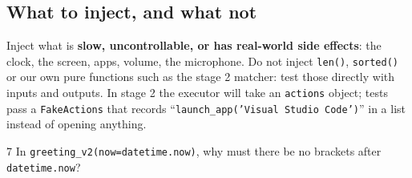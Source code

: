\documentclass[11pt,a4paper]{article}
\begin{document}
\subsection{What to inject, and what not}
Inject what is \textbf{slow, uncontrollable, or has real-world side effects}: the clock, the
screen, apps, volume, the microphone. Do not inject \texttt{len()}, \texttt{sorted()} or our own
pure functions such as the stage 2 matcher: test those directly with inputs and outputs. In
stage 2 the executor will take an \texttt{actions} object; tests pass a \texttt{FakeActions} that
records ``\texttt{launch\_app('Visual Studio Code')}'' in a list instead of opening anything.

\begin{quickcheck}{7}
In \texttt{greeting\_v2(now=datetime.now)}, why must there be no brackets after
\texttt{datetime.now}?
\end{quickcheck}

\end{document}
